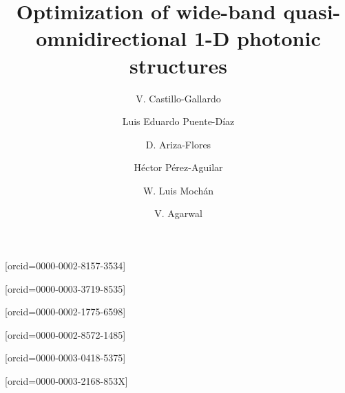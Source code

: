 \documentclass[a4paper,fleqn]{cas-sc}
\begin{document}

\let\WriteBookmarks\relax
\def\floatpagepagefraction{1}
\def\textpagefraction{.001}

\title [mode = title]{Optimization of wide-band quasi-omnidirectional 1-D photonic structures}

\author[1,2,3]{V. Castillo-Gallardo}[orcid=0000-0002-8157-3534]
\cormark[1]
\address[1]{Centro de Investigaci\'{o}n en Ingenier\'{i}a y
  Ciencias Aplicadas, Universidad del Estado de Morelos, Av.
  Universidad 1001, Col. Chamilpa, Cuernavaca, Morelos 62209,
  M\'{e}xico.}

\author[1,2,3]{Luis Eduardo Puente-D\'{i}az}[orcid=0000-0003-3719-8535]
\address[2]{Instituto de Ciencias F\'{i}sicas, Universidad
  Nacional Aut\'{o}noma de M\'{e}xico, Av. Universidad S/N,
  Col. Chamilpa, 62210 Cuernavaca, Morelos, M\'{e}xico.}
\address[3]{Facultad de Ciencias F\'{i}sico Matem\'{a}ticas,
  Universidad Michoacana de San Nicol\'{a}s de Hidalgo, Av.
  Francisco J. M\'ugica S/N 58030, Morelia, Mich., M\'{e}xico.}

\author[4]{D. Ariza-Flores}[orcid=0000-0002-1775-6598]
\address[4]{CONACyT-Universidad Aut\'{o}noma de San Luis
  Potos\'{i}, Karakorum 1470, Lomas 4ta Secc, San Luis Potos\'{i},
  S.L.P., 78210, M\'{e}xico.}

\author[3]{H\'{e}ctor P\'{e}rez-Aguilar}[orcid=0000-0002-8572-1485]

\author[2]{W. Luis Moch\'{a}n}[orcid=0000-0003-0418-5375]

\author[1]{V. Agarwal}[orcid=0000-0003-2168-853X]
\fnmark[1]

\end{document}
